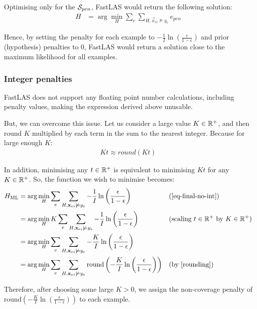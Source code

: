 Optimising only for the $\mathcal{S}_{pen}$, FastLAS would return the following solution:
\begin{align}
H
& = \arg\min_{H}
\sum_e  
\sum_{H,\vec{x}_{ei}\not\models y_e} e_{pen}
\end{align}

Hence, by setting the penalty for each example to $-\frac{1}{I} \ln \left ( \frac{\epsilon}{1 - \epsilon} \right )$ and prior (hypothesis) penalties to 0, FastLAS would return a solution close to the maximum likelihood for all examples.

\subsubsection{Integer penalties}
\label{integer-penalties}

FastLAS does not support any floating point number calculations, including penalty values, making the expression derived above unusable.

But, we can overcome this issue.
Let us consider a large value $K \in \mathbb{R}^+$, and then round $K$ multiplied by each term in the sum to the nearest integer. Because for large enough $K$:
\begin{align}
    Kt \approx round(Kt) \label{rounding}
\end{align}

In addition, minimising any $t \in \mathbb{R}^+$ is equivalent to minimising $K t$ for any $K \in \mathbb{R}^+$.
So, the function we wish to minimise becomes: 
\begin{align}
H_{\text{ML}}
& = \arg\min_{H}
\sum_e  
\sum_{H,\textbf{x}_{ei}\not\models y_e} -\frac{1}{I}\ln \left ( \frac{\epsilon}{1 - \epsilon} \right ) 
&& \text{(\ref{eq-final-no-int})} \nonumber \\
& = \arg\min_{H}
K \sum_e  
\sum_{H,\textbf{x}_{ei}\not\models y_e} -\frac{1}{I}\ln \left ( \frac{\epsilon}{1 - \epsilon} \right ) 
&& \text{(scaling $t \in \mathbb{R}^+$ by $K \in \mathbb{R}^+$)} \nonumber \\
& = \arg\min_{H}
\sum_e  
\sum_{H,\textbf{x}_{ei}\not\models y_e} -\frac{K}{I}\ln \left ( \frac{\epsilon}{1 - \epsilon} \right ) \nonumber \\ 
& = \arg\min_{H}
\sum_e  
\sum_{H,\textbf{x}_{ei}\not\models y_e} \text{round} \left ( -\frac{K}{I}\ln \left ( \frac{\epsilon}{1 - \epsilon} \right ) \right )
&& \text{(by \ref{rounding})}
\end{align}

Therefore, after choosing some large $K > 0$, we assign the non-coverage penalty of $\text{round} \left ( -\frac{K}{I} \ln \left ( \frac{\epsilon}{1 - \epsilon} \right ) \right )$ to each example.


